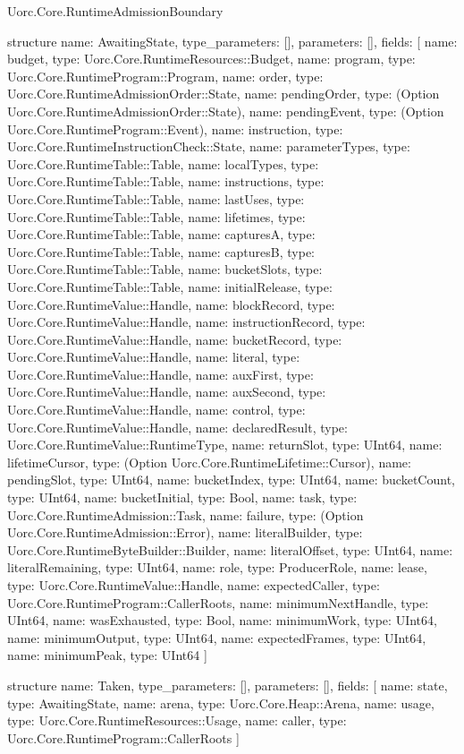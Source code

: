 \begin{lexlean}{Uorc.Core.RuntimeAdmissionBoundary}
\begin{semanticmodule}
structure{
  name: AwaitingState,
  type_parameters: [],
  parameters: [],
  fields: [
    {name: budget, type: Uorc.Core.RuntimeResources::Budget},
    {name: program, type: Uorc.Core.RuntimeProgram::Program},
    {name: order, type: Uorc.Core.RuntimeAdmissionOrder::State},
    {name: pendingOrder, type: (Option Uorc.Core.RuntimeAdmissionOrder::State)},
    {name: pendingEvent, type: (Option Uorc.Core.RuntimeProgram::Event)},
    {name: instruction, type: Uorc.Core.RuntimeInstructionCheck::State},
    {name: parameterTypes, type: Uorc.Core.RuntimeTable::Table},
    {name: localTypes, type: Uorc.Core.RuntimeTable::Table},
    {name: instructions, type: Uorc.Core.RuntimeTable::Table},
    {name: lastUses, type: Uorc.Core.RuntimeTable::Table},
    {name: lifetimes, type: Uorc.Core.RuntimeTable::Table},
    {name: capturesA, type: Uorc.Core.RuntimeTable::Table},
    {name: capturesB, type: Uorc.Core.RuntimeTable::Table},
    {name: bucketSlots, type: Uorc.Core.RuntimeTable::Table},
    {name: initialRelease, type: Uorc.Core.RuntimeValue::Handle},
    {name: blockRecord, type: Uorc.Core.RuntimeValue::Handle},
    {name: instructionRecord, type: Uorc.Core.RuntimeValue::Handle},
    {name: bucketRecord, type: Uorc.Core.RuntimeValue::Handle},
    {name: literal, type: Uorc.Core.RuntimeValue::Handle},
    {name: auxFirst, type: Uorc.Core.RuntimeValue::Handle},
    {name: auxSecond, type: Uorc.Core.RuntimeValue::Handle},
    {name: control, type: Uorc.Core.RuntimeValue::Handle},
    {name: declaredResult, type: Uorc.Core.RuntimeValue::RuntimeType},
    {name: returnSlot, type: UInt64},
    {name: lifetimeCursor, type: (Option Uorc.Core.RuntimeLifetime::Cursor)},
    {name: pendingSlot, type: UInt64},
    {name: bucketIndex, type: UInt64},
    {name: bucketCount, type: UInt64},
    {name: bucketInitial, type: Bool},
    {name: task, type: Uorc.Core.RuntimeAdmission::Task},
    {name: failure, type: (Option Uorc.Core.RuntimeAdmission::Error)},
    {name: literalBuilder, type: Uorc.Core.RuntimeByteBuilder::Builder},
    {name: literalOffset, type: UInt64},
    {name: literalRemaining, type: UInt64},
    {name: role, type: ProducerRole},
    {name: lease, type: Uorc.Core.RuntimeValue::Handle},
    {name: expectedCaller, type: Uorc.Core.RuntimeProgram::CallerRoots},
    {name: minimumNextHandle, type: UInt64},
    {name: wasExhausted, type: Bool},
    {name: minimumWork, type: UInt64},
    {name: minimumOutput, type: UInt64},
    {name: expectedFrames, type: UInt64},
    {name: minimumPeak, type: UInt64}
  ]
}

structure{
  name: Taken,
  type_parameters: [],
  parameters: [],
  fields: [
    {name: state, type: AwaitingState},
    {name: arena, type: Uorc.Core.Heap::Arena},
    {name: usage, type: Uorc.Core.RuntimeResources::Usage},
    {name: caller, type: Uorc.Core.RuntimeProgram::CallerRoots}
  ]
}


\end{semanticmodule}
\end{lexlean}
